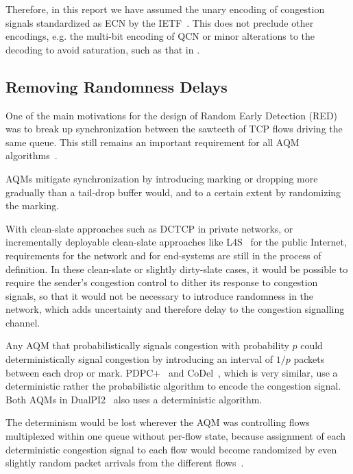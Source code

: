 Therefore, in this report we have assumed the unary encoding of congestion signals standardized as ECN by the IETF~\cite{IETF_RFC3168:ECN_IP_TCP}. This does not preclude other encodings, e.g. the multi-bit encoding of QCN or minor alterations to the decoding to avoid saturation, such as that in \cite{Briscoe17a:CC_Tensions_TR}.

\subsection{Removing Randomness Delays}\label{sec:rand_delay}

One of the main motivations for the design of Random Early Detection (RED)~\cite{Floyd93:RED} was to break up synchronization between the sawteeth of TCP flows driving the same queue. This still remains an important requirement for all AQM algorithms~\cite{Baker15:AQM_Recommendations}.

AQMs mitigate synchronization by introducing marking or dropping more gradually than a tail-drop buffer would, and to a certain extent by randomizing the marking. 

With clean-slate approaches such as DCTCP in private networks, or incrementally deployable clean-slate approaches like L4S~\cite{Briscoe16a:l4s-arch_ID} for the public Internet, requirements for the network and for end-systems are still in the process of definition. In these clean-slate or slightly dirty-slate cases, it would be possible to require the sender's congestion control to dither its response to congestion signals, so that it would not be necessary to introduce randomness in the network, which adds uncertainty and therefore delay to the congestion signalling channel. 

Any AQM that probabilistically signals congestion with probability \(p\) could deterministically signal congestion by introducing an interval of \(1/p\) packets between each drop or mark. PDPC+~\cite{Sagfors03:PDPC_vary} and CoDel~\cite{Nichols12:CoDel}, which is very similar, use a deterministic rather the probabilistic algorithm to encode the congestion signal. Both AQMs in DualPI2~\cite[Appx.\ A]{Briscoe15e:DualQ-Coupled-AQM_ID} also uses a deterministic algorithm.

The determinism would be lost wherever the AQM was controlling flows multiplexed within one queue without per-flow state, because assignment of each deterministic congestion signal to each flow would become randomized by even slightly random packet arrivals from the different flows~\cite{Briscoe15d:PIE_rvw}.

